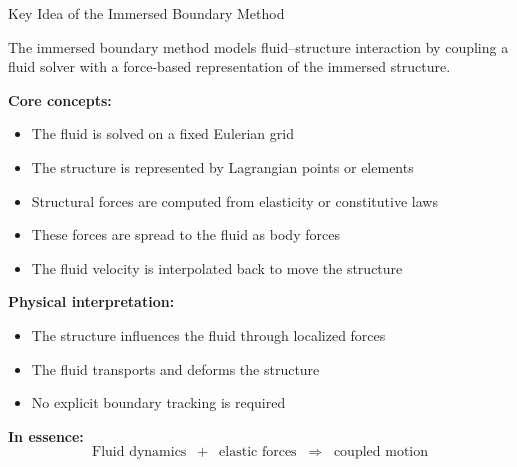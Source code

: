 \documentclass{beamer}
\begin{document}
\begin{frame}{Key Idea of the Immersed Boundary Method}
\small

The immersed boundary method models fluid--structure interaction
by coupling a fluid solver with a force-based representation
of the immersed structure.

\medskip
\textbf{Core concepts:}
\begin{itemize}
    \item The fluid is solved on a fixed Eulerian grid
    \item The structure is represented by Lagrangian points or elements
    \item Structural forces are computed from elasticity or constitutive laws
    \item These forces are spread to the fluid as body forces
    \item The fluid velocity is interpolated back to move the structure
\end{itemize}

\medskip
\textbf{Physical interpretation:}
\begin{itemize}
    \item The structure influences the fluid through localized forces
    \item The fluid transports and deforms the structure
    \item No explicit boundary tracking is required
\end{itemize}

\medskip
\textbf{In essence:}
\[
\text{Fluid dynamics} \;\;+\;\; \text{elastic forces} \;\;\Rightarrow\;\; \text{coupled motion}
\]
\end{frame}
\end{document}
